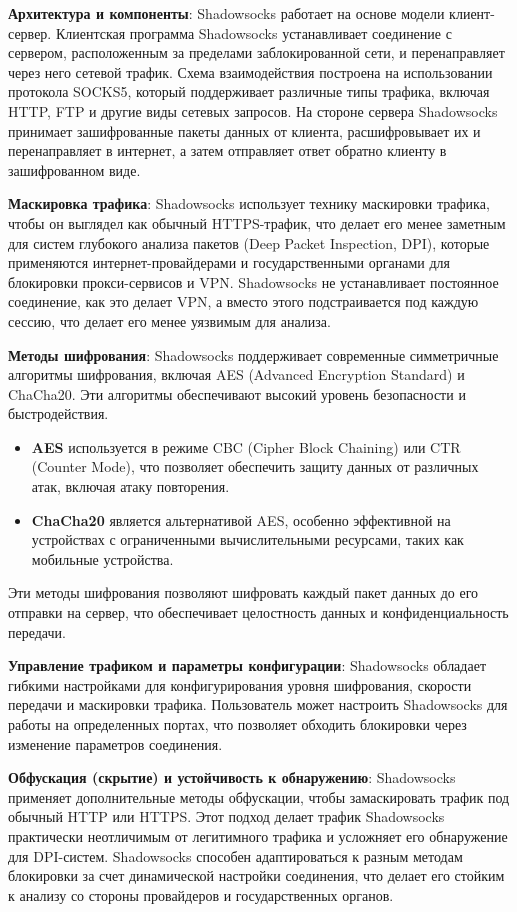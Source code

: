 \documentclass[a4paper,12pt]{article}
\begin{document}
\textbf{Архитектура и компоненты}: Shadowsocks работает на основе модели клиент-сервер. Клиентская программа Shadowsocks устанавливает соединение с сервером, расположенным за пределами заблокированной сети, и перенаправляет через него сетевой трафик. Схема взаимодействия построена на использовании протокола SOCKS5, который поддерживает различные типы трафика, включая HTTP, FTP и другие виды сетевых запросов. На стороне сервера Shadowsocks принимает зашифрованные пакеты данных от клиента, расшифровывает их и перенаправляет в интернет, а затем отправляет ответ обратно клиенту в зашифрованном виде.

\textbf{Маскировка трафика}: Shadowsocks использует технику маскировки трафика, чтобы он выглядел как обычный HTTPS-трафик, что делает его менее заметным для систем глубокого анализа пакетов (Deep Packet Inspection, DPI), которые применяются интернет-провайдерами и государственными органами для блокировки прокси-сервисов и VPN. Shadowsocks не устанавливает постоянное соединение, как это делает VPN, а вместо этого подстраивается под каждую сессию, что делает его менее уязвимым для анализа.

\textbf{Методы шифрования}: Shadowsocks поддерживает современные симметричные алгоритмы шифрования, включая AES (Advanced Encryption Standard) и ChaCha20. Эти алгоритмы обеспечивают высокий уровень безопасности и быстродействия. 
\begin{itemize}
    \item \textbf{AES} используется в режиме CBC (Cipher Block Chaining) или CTR (Counter Mode), что позволяет обеспечить защиту данных от различных атак, включая атаку повторения.
    \item \textbf{ChaCha20} является альтернативой AES, особенно эффективной на устройствах с ограниченными вычислительными ресурсами, таких как мобильные устройства.
\end{itemize}
Эти методы шифрования позволяют шифровать каждый пакет данных до его отправки на сервер, что обеспечивает целостность данных и конфиденциальность передачи.

\textbf{Управление трафиком и параметры конфигурации}: Shadowsocks обладает гибкими настройками для конфигурирования уровня шифрования, скорости передачи и маскировки трафика. Пользователь может настроить Shadowsocks для работы на определенных портах, что позволяет обходить блокировки через изменение параметров соединения.

\textbf{Обфускация (скрытие) и устойчивость к обнаружению}: Shadowsocks применяет дополнительные методы обфускации, чтобы замаскировать трафик под обычный HTTP или HTTPS. Этот подход делает трафик Shadowsocks практически неотличимым от легитимного трафика и усложняет его обнаружение для DPI-систем. Shadowsocks способен адаптироваться к разным методам блокировки за счет динамической настройки соединения, что делает его стойким к анализу со стороны провайдеров и государственных органов.
\end{document}
